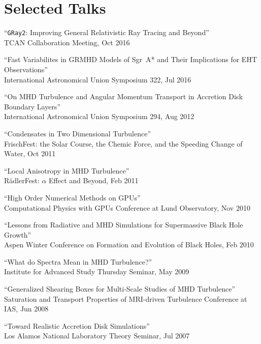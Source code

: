 \section*{Selected Talks}

\begin{ilist}

\item ``\texttt{GRay2}: Improving General Relativistic Ray Tracing and Beyond''\\
  TCAN Collaboration Meeting, Oct 2016

\item ``Fast Variabilites in GRMHD Models of Sgr~A* and Their Implications for EHT Observations''\\
  International Astronomical Union Symposium 322, Jul 2016

\item ``On MHD Turbulence and Angular Momentum Transport in Accretion Disk Boundary Layers''\\
  International Astronomical Union Symposium 294, Aug 2012

\item ``Condensates in Two Dimensional Turbulence''\\
  FrischFest: the Solar Course, the Chemic Force, and the Speeding Change of Water, Oct 2011

\item ``Local Anisotropy in MHD Turbulence''\\
  R{\"a}dlerFest: $\alpha$ Effect and Beyond, Feb 2011

\item ``High Order Numerical Methods on GPUs''\\
  Computational Physics with GPUs Conference at Lund Observatory, Nov 2010

\item ``Lessons from Radiative and MHD Simulations for Supermassive Black Hole Growth''\\
  Aspen Winter Conference on Formation and Evolution of Black Holes, Feb 2010

\item ``What do Spectra Mean in MHD Turbulence?''\\
  Institute for Advanced Study Thursday Seminar, May 2009

\item ``Generalized Shearing Boxes for Multi-Scale Studies of MHD Turbulence''\\
  Saturation and Transport Properties of MRI-driven Turbulence Conference at IAS, Jun 2008

\item ``Toward Realistic Accretion Disk Simulations''\\
  Los Alamos National Laboratory Theory Seminar, Jul 2007

\end{ilist}
